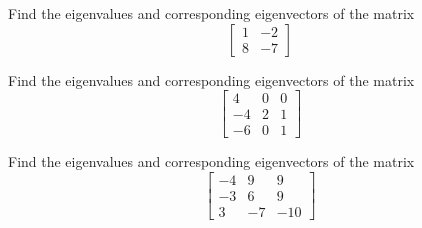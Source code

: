 \begin{exercise}\ansMark%
Find the eigenvalues and corresponding eigenvectors of the matrix 
\[ \begin{bmatrix} 1 & -2 \\ 8 & -7 \end{bmatrix} \]
\end{exercise}

\begin{exercise}\ansMark%
Find the eigenvalues and corresponding eigenvectors of the matrix 
\[ \begin{bmatrix} 4 & 0 & 0 \\ -4 & 2 & 1 \\ -6 & 0 & 1 \end{bmatrix} \]
\end{exercise}

\begin{exercise}\ansMark%
Find the eigenvalues and corresponding eigenvectors of the matrix 
\[ \begin{bmatrix} -4 & 9 & 9 \\ -3 & 6 & 9 \\ 3 & -7 & -10 \end{bmatrix} \]
\end{exercise}

